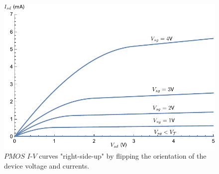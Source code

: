 \begin{figure}[H]
\centering
\includegraphics[width=\columnwidth]{ids_pmos_negative}
\caption{$PMOS$ $I$-$V$ curves "right-side-up" by flipping the orientation of the device voltage and currents.}
\label{fig:ids_pmos_negative}
\end{figure}

